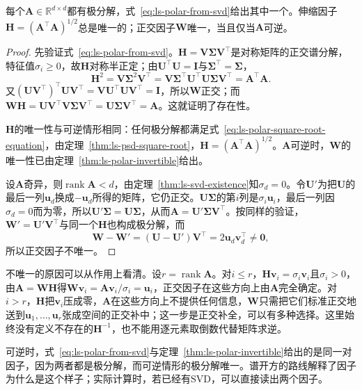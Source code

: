\begin{theorem}[一般方阵的极分解]
\label{thm:ls-polar-general}
每个$\bm A\in\mathbb R^{d\times d}$都有极分解，式~\eqref{eq:ls-polar-from-svd}给出其中一个。伸缩因子$\bm H=(\bm A^\top\bm A)^{1/2}$总是唯一的；正交因子$\bm W$唯一，当且仅当$\bm A$可逆。
\end{theorem}
\begin{proof}
先验证式~\eqref{eq:ls-polar-from-svd}。$\bm H=\bm V\bm\Sigma\bm V^\top$是对称矩阵的正交谱分解，特征值$\sigma_i\geq0$，故$\bm H$对称半正定；由$\bm U^\top\bm U=\bm I$与$\bm\Sigma^\top=\bm\Sigma$，
\[
 \bm H^2=\bm V\bm\Sigma^2\bm V^\top
 =\bm V\bm\Sigma^\top\bm U^\top\bm U\bm\Sigma\bm V^\top
 =\bm A^\top\bm A .
\]
又$(\bm U\bm V^\top)^\top\bm U\bm V^\top=\bm V\bm U^\top\bm U\bm V^\top=\bm I$，所以$\bm W$正交；而$\bm W\bm H=\bm U\bm V^\top\bm V\bm\Sigma\bm V^\top=\bm U\bm\Sigma\bm V^\top=\bm A$。这就证明了存在性。

$\bm H$的唯一性与可逆情形相同：任何极分解都满足式~\eqref{eq:ls-polar-square-root-equation}，由定理~\ref{thm:ls-psd-square-root}，$\bm H=(\bm A^\top\bm A)^{1/2}$。$\bm A$可逆时，$\bm W$的唯一性已由定理~\ref{thm:ls-polar-invertible}给出。

设$\bm A$奇异，则$\operatorname{rank}\bm A<d$，由定理~\ref{thm:ls-svd-existence}知$\sigma_d=0$。令$\bm U'$为把$\bm U$的最后一列$\bm u_d$换成$-\bm u_d$所得的矩阵，它仍正交。$\bm U\bm\Sigma$的第$i$列是$\sigma_i\bm u_i$，最后一列因$\sigma_d=0$而为零，所以$\bm U'\bm\Sigma=\bm U\bm\Sigma$，从而$\bm A=\bm U'\bm\Sigma\bm V^\top$。按同样的验证，$\bm W'=\bm U'\bm V^\top$与同一个$\bm H$也构成极分解，而
\[
 \bm W-\bm W'=(\bm U-\bm U')\bm V^\top=2\bm u_d\bm v_d^\top\neq\bm0 ,
\]
所以正交因子不唯一。
\end{proof}

不唯一的原因可以从作用上看清。设$r=\operatorname{rank}\bm A$。对$i\leq r$，$\bm H\bm v_i=\sigma_i\bm v_i$且$\sigma_i>0$，由$\bm A=\bm W\bm H$得$\bm W\bm v_i=\bm A\bm v_i/\sigma_i=\bm u_i$，正交因子在这些方向上由$\bm A$完全确定。对$i>r$，$\bm H$把$\bm v_i$压成零，$\bm A$在这些方向上不提供任何信息，$\bm W$只需把它们标准正交地送到$\bm u_1,\ldots,\bm u_r$张成空间的正交补中；这一步是正交补全，可以有多种选择。这里始终没有定义不存在的$\bm H^{-1}$，也不能用逐元素取倒数代替矩阵求逆。

可逆时，式~\eqref{eq:ls-polar-from-svd}与定理~\ref{thm:ls-polar-invertible}给出的是同一对因子，因为两者都是极分解，而可逆情形的极分解唯一。谱开方的路线解释了因子为什么是这个样子；实际计算时，若已经有SVD，可以直接读出两个因子。

